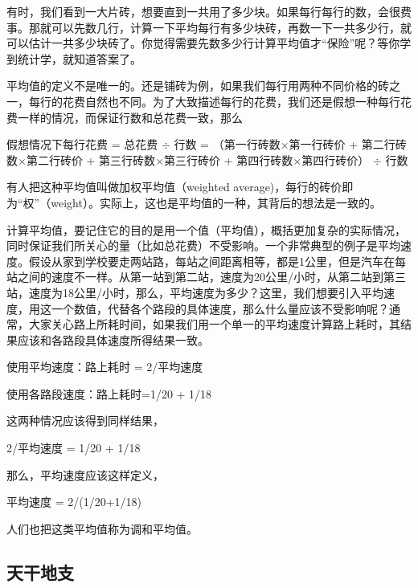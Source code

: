 有时，我们看到一大片砖，想要直到一共用了多少块。如果每行每行的数，会很费事。那就可以先数几行，计算一下平均每行有多少块砖，再数一下一共多少行，就可以估计一共多少块砖了。你觉得需要先数多少行计算平均值才“保险”呢？等你学到统计学，就知道答案了。

平均值的定义不是唯一的。还是铺砖为例，如果我们每行用两种不同价格的砖之一，每行的花费自然也不同。为了大致描述每行的花费，我们还是假想一种每行花费一样的情况，而保证行数和总花费一致，那么

假想情况下每行花费 = 总花费 $\div$ 行数 = （第一行砖数$\times$第一行砖价 + 第二行砖数$\times$第二行砖价 + 第三行砖数$\times$第三行砖价 + 第四行砖数$\times$第四行砖价） $\div$ 行数

有人把这种平均值叫做加权平均值（weighted average)，每行的砖价即为“权”（weight）。实际上，这也是平均值的一种，其背后的想法是一致的。

计算平均值，要记住它的目的是用一个值（平均值），概括更加复杂的实际情况，同时保证我们所关心的量（比如总花费）不受影响。一个非常典型的例子是平均速度。假设从家到学校要走两站路，每站之间距离相等，都是1公里，但是汽车在每站之间的速度不一样。从第一站到第二站，速度为20公里/小时，从第二站到第三站，速度为18公里/小时，那么，平均速度为多少？这里，我们想要引入平均速度，用这一个数值，代替各个路段的具体速度，那么什么量应该不受影响呢？通常，大家关心路上所耗时间，如果我们用一个单一的平均速度计算路上耗时，其结果应该和各路段具体速度所得结果一致。

使用平均速度：路上耗时 = 2/平均速度

使用各路段速度：路上耗时=1/20 + 1/18
     
     这两种情况应该得到同样结果，

2/平均速度 = 1/20 + 1/18 

    那么，平均速度应该这样定义，
    
平均速度 = 2/(1/20+1/18) 

人们也把这类平均值称为调和平均值。

\subsection{天干地支}




